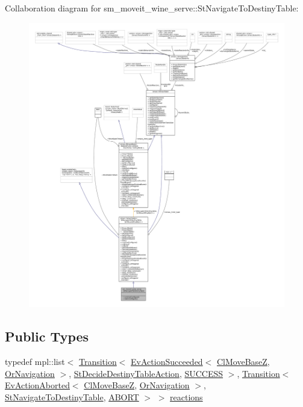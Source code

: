 Collaboration diagram for sm\+\_\+moveit\+\_\+wine\+\_\+serve\+:\+:St\+Navigate\+To\+Destiny\+Table\+:
\nopagebreak
\begin{figure}[H]
\begin{center}
\leavevmode
\includegraphics[width=350pt]{structsm__moveit__wine__serve_1_1StNavigateToDestinyTable__coll__graph}
\end{center}
\end{figure}
\subsection*{Public Types}
\begin{DoxyCompactItemize}
\item 
typedef mpl\+::list$<$ \hyperlink{classsmacc_1_1Transition}{Transition}$<$ \hyperlink{structsmacc_1_1default__events_1_1EvActionSucceeded}{Ev\+Action\+Succeeded}$<$ \hyperlink{classcl__move__base__z_1_1ClMoveBaseZ}{Cl\+Move\+BaseZ}, \hyperlink{classsm__moveit__wine__serve_1_1OrNavigation}{Or\+Navigation} $>$, \hyperlink{structsm__moveit__wine__serve_1_1StDecideDestinyTableAction}{St\+Decide\+Destiny\+Table\+Action}, \hyperlink{structsmacc_1_1default__transition__tags_1_1SUCCESS}{S\+U\+C\+C\+E\+SS} $>$, \hyperlink{classsmacc_1_1Transition}{Transition}$<$ \hyperlink{structsmacc_1_1default__events_1_1EvActionAborted}{Ev\+Action\+Aborted}$<$ \hyperlink{classcl__move__base__z_1_1ClMoveBaseZ}{Cl\+Move\+BaseZ}, \hyperlink{classsm__moveit__wine__serve_1_1OrNavigation}{Or\+Navigation} $>$, \hyperlink{structsm__moveit__wine__serve_1_1StNavigateToDestinyTable}{St\+Navigate\+To\+Destiny\+Table}, \hyperlink{structsmacc_1_1default__transition__tags_1_1ABORT}{A\+B\+O\+RT} $>$ $>$ \hyperlink{structsm__moveit__wine__serve_1_1StNavigateToDestinyTable_a4ce878473a21efd9f22b93a366735f7a}{reactions}
\end{DoxyCompactItemize}
